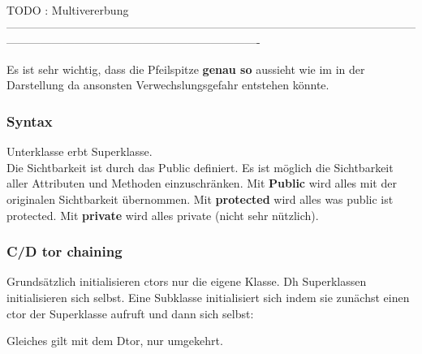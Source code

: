 TODO : Multivererbung -------------------------------------------------------------------------------------------------------------------------------------------------------------------------------

Es ist sehr wichtig, dass die Pfeilspitze \textbf{genau so} aussieht wie im in der Darstellung da ansonsten Verwechslungsgefahr entstehen könnte.
\subsubsection{Syntax}



Unterklasse erbt Superklasse.\\

Die Sichtbarkeit ist durch das Public definiert. 
Es ist möglich die Sichtbarkeit aller Attributen und Methoden einzuschränken. 
Mit \textbf{Public} wird alles mit der originalen Sichtbarkeit übernommen. 
Mit \textbf{protected} wird alles was public ist protected. 
Mit \textbf{private} wird alles private (nicht sehr nützlich).

\subsubsection{C/D tor chaining}

Grundsätzlich initialisieren ctors nur die eigene Klasse. 
Dh Superklassen initialisieren sich selbst. 
Eine Subklasse initialisiert sich indem sie zunächst einen ctor der Superklasse aufruft und dann sich selbst:



Gleiches gilt mit dem Dtor, nur umgekehrt.



